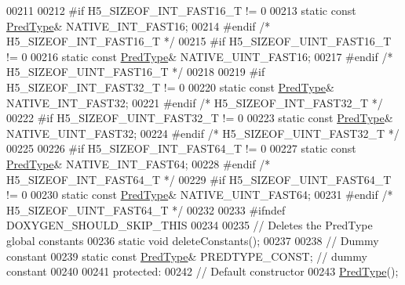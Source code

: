 \begin{DoxyCode}
00211 
00212 \textcolor{preprocessor}{#if H5\_SIZEOF\_INT\_FAST16\_T != 0}
00213         \textcolor{keyword}{static} \textcolor{keyword}{const} \hyperlink{class_h5_1_1_pred_type}{PredType}& NATIVE\_INT\_FAST16;
00214 \textcolor{preprocessor}{#endif }\textcolor{comment}{/* H5\_SIZEOF\_INT\_FAST16\_T */}\textcolor{preprocessor}{}
00215 \textcolor{preprocessor}{#if H5\_SIZEOF\_UINT\_FAST16\_T != 0}
00216         \textcolor{keyword}{static} \textcolor{keyword}{const} \hyperlink{class_h5_1_1_pred_type}{PredType}& NATIVE\_UINT\_FAST16;
00217 \textcolor{preprocessor}{#endif }\textcolor{comment}{/* H5\_SIZEOF\_UINT\_FAST16\_T */}\textcolor{preprocessor}{}
00218 
00219 \textcolor{preprocessor}{#if H5\_SIZEOF\_INT\_FAST32\_T != 0}
00220         \textcolor{keyword}{static} \textcolor{keyword}{const} \hyperlink{class_h5_1_1_pred_type}{PredType}& NATIVE\_INT\_FAST32;
00221 \textcolor{preprocessor}{#endif }\textcolor{comment}{/* H5\_SIZEOF\_INT\_FAST32\_T */}\textcolor{preprocessor}{}
00222 \textcolor{preprocessor}{#if H5\_SIZEOF\_UINT\_FAST32\_T != 0}
00223         \textcolor{keyword}{static} \textcolor{keyword}{const} \hyperlink{class_h5_1_1_pred_type}{PredType}& NATIVE\_UINT\_FAST32;
00224 \textcolor{preprocessor}{#endif }\textcolor{comment}{/* H5\_SIZEOF\_UINT\_FAST32\_T */}\textcolor{preprocessor}{}
00225 
00226 \textcolor{preprocessor}{#if H5\_SIZEOF\_INT\_FAST64\_T != 0}
00227         \textcolor{keyword}{static} \textcolor{keyword}{const} \hyperlink{class_h5_1_1_pred_type}{PredType}& NATIVE\_INT\_FAST64;
00228 \textcolor{preprocessor}{#endif }\textcolor{comment}{/* H5\_SIZEOF\_INT\_FAST64\_T */}\textcolor{preprocessor}{}
00229 \textcolor{preprocessor}{#if H5\_SIZEOF\_UINT\_FAST64\_T != 0}
00230         \textcolor{keyword}{static} \textcolor{keyword}{const} \hyperlink{class_h5_1_1_pred_type}{PredType}& NATIVE\_UINT\_FAST64;
00231 \textcolor{preprocessor}{#endif }\textcolor{comment}{/* H5\_SIZEOF\_UINT\_FAST64\_T */}\textcolor{preprocessor}{}
00232 
00233 \textcolor{preprocessor}{#ifndef DOXYGEN\_SHOULD\_SKIP\_THIS}
00234 
00235         \textcolor{comment}{// Deletes the PredType global constants}
00236         \textcolor{keyword}{static} \textcolor{keywordtype}{void} deleteConstants();
00237 
00238         \textcolor{comment}{// Dummy constant}
00239         \textcolor{keyword}{static} \textcolor{keyword}{const} \hyperlink{class_h5_1_1_pred_type}{PredType}& PREDTYPE\_CONST; \textcolor{comment}{// dummy constant}
00240 
00241    \textcolor{keyword}{protected}:
00242         \textcolor{comment}{// Default constructor}
00243         \hyperlink{class_h5_1_1_pred_type}{PredType}();

\end{DoxyCode}
